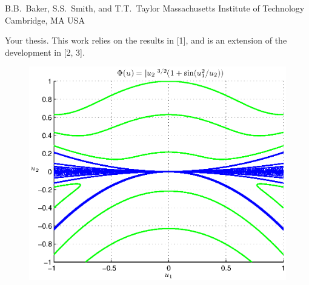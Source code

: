 %
%
%

{%
B.B.~Baker, S.S.~Smith, and T.T.~Taylor%
}
{%
Massachusetts Institute of Technology%
}
{%
Cambridge, MA%
}
{%
USA%
}

%
%
Your thesis. This work relies on the results in [1], and is an extension of the development in [2, 3].

\begin{figure}[!h]
  \centering
  \includegraphics[width=0.7\maxpicturewidth]{your_figure.eps}
\end{figure}

